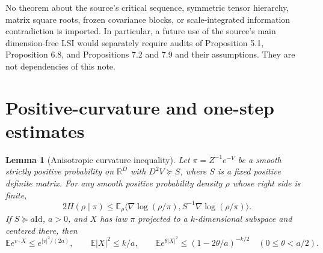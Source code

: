 \documentclass[11pt]{article}
\newtheorem{lemma}[theorem]{Lemma}
\theoremstyle{remark}\newtheorem{remark}[theorem]{Remark}
\newcommand{\E}{\mathbb E}
\newcommand{\R}{\mathbb R}
\newcommand{\Id}{\mathrm{Id}}
\begin{document}
No theorem about the source's critical sequence, symmetric tensor hierarchy,
matrix square roots, frozen covariance blocks, or scale-integrated information
contradiction is imported. In particular, a future use of the source's main
dimension-free LSI would separately require audits of Proposition 5.1,
Proposition 6.8, and Propositions 7.2 and 7.9 and their assumptions. They are
not dependencies of this note.

\section{Positive-curvature and one-step estimates}
\begin{lemma}[Anisotropic curvature inequality]\label{lem:curvature}
Let $\pi=Z^{-1}e^{-V}$ be a smooth strictly positive probability on $\R^D$
with $D^2V\succeq S$, where $S$ is a fixed positive definite matrix.
For any smooth positive probability density $\rho$ whose right side is finite,
\begin{equation}\label{eq:lsi}
2H(\rho\mid\pi)\le
\E_\rho\langle\nabla\log(\rho/\pi),S^{-1}\nabla\log(\rho/\pi)\rangle.
\end{equation}
If $S\succeq a\Id$, $a>0$, and $X$ has law $\pi$ projected to a $k$-dimensional
subspace and centered there, then
\begin{equation}\label{eq:subgauss}
\E e^{v\cdot X}\le e^{|v|^2/(2a)},\qquad
\E|X|^2\le k/a,\qquad
\E e^{\theta|X|^2}\le(1-2\theta/a)^{-k/2}\quad(0\le\theta<a/2).
\end{equation}
\end{lemma}
\end{document}
